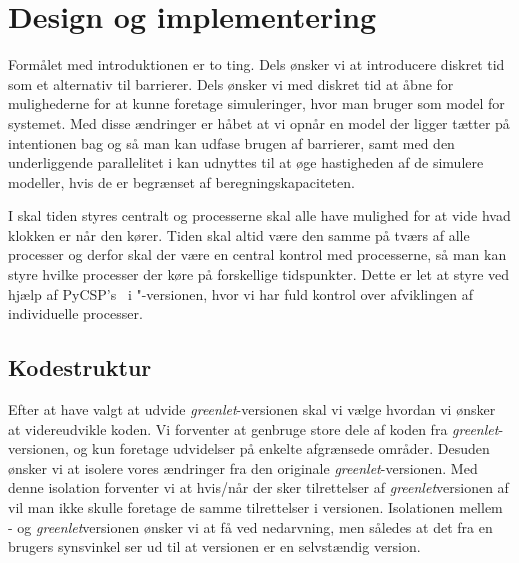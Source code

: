 
\section{Design og implementering}
\begin{shaded}
Formålet med introduktionen er to ting. Dels ønsker vi at introducere diskret tid som et alternativ til barrierer. Dels ønsker vi med diskret tid at åbne for mulighederne for at kunne foretage simuleringer, hvor man bruger \csp som model for systemet. Med disse ændringer er håbet at vi opnår en model der ligger tætter på intentionen bag \csp og så man kan udfase brugen af barrierer, samt med den underliggende parallelitet i \csp kan udnyttes til at øge hastigheden af de simulere modeller, hvis de er begrænset af beregningskapaciteten.

I \des  skal tiden styres centralt og processerne skal alle have mulighed for at vide hvad klokken er når den kører. Tiden skal altid være den samme på tværs af alle processer og derfor skal der være en central kontrol med processerne, så man kan styre hvilke processer der køre på forskellige tidspunkter. Dette er let at styre ved hjælp af PyCSP's \sched ~i "-versionen, hvor vi har fuld kontrol over afviklingen af individuelle processer. 
\end{shaded}

\subsection{Kodestruktur}  
Efter at have valgt at udvide \emph{greenlet}-versionen skal vi vælge hvordan vi ønsker at videreudvikle koden. Vi forventer at genbruge store dele af koden fra \emph{greenlet}-versionen, og kun foretage udvidelser på enkelte afgrænsede områder. Desuden ønsker vi at isolere vores ændringer fra den originale \emph{greenlet}-versionen. Med denne isolation forventer vi at hvis/når der sker tilrettelser af \emph{greenlet}versionen af \pycsp vil man ikke skulle foretage de samme tilrettelser i \des versionen. 
Isolationen mellem \des- og \emph{greenlet}versionen ønsker vi at få ved nedarvning, men således at det fra en brugers synsvinkel ser ud til at \des versionen er en selvstændig version.


